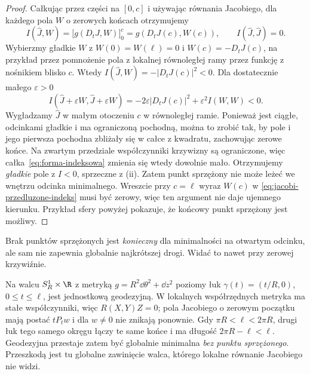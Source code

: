 \begin{proof}
Całkując przez części na $[0,c]$ i używając
równania Jacobiego, dla każdego pola $W$
o zerowych końcach otrzymujemy
\begin{equation}\label{eq:jacobi-przedluzone-indeks}
 I(\widehat J,W)
 =\bigl[g(D_tJ,W)\bigr]_0^c
 =g(D_tJ(c),W(c)),
 \qquad I(\widehat J,\widehat J)=0.
\end{equation}
Wybierzmy gładkie $W$ z $W(0)=W(\ell)=0$
i $W(c)=-D_tJ(c)$, na przykład przez
pomnożenie pola z lokalnej równoległej ramy
przez funkcję z nośnikiem blisko $c$.
Wtedy $I(\widehat J,W)=-|D_tJ(c)|^2<0$.
Dla dostatecznie małego $\varepsilon>0$
\[
 I(\widehat J+\varepsilon W,
   \widehat J+\varepsilon W)
 =-2\varepsilon|D_tJ(c)|^2
       +\varepsilon^2 I(W,W)<0.
\]
Wygładzamy $\widehat J$ w małym otoczeniu $c$
w równoległej ramie. Ponieważ jest ciągłe,
odcinkami gładkie i ma ograniczoną pochodną,
można to zrobić tak, by pole i jego pierwsza
pochodna zbliżały się w całce z kwadratu,
zachowując zerowe końce. Na zwartym przedziale
współczynniki krzywizny są ograniczone,
więc całka~\eqref{eq:forma-indeksowa}
zmienia się wtedy dowolnie mało. Otrzymujemy
\emph{gładkie} pole z $I<0$, sprzeczne z (ii).
Zatem punkt sprzężony nie może leżeć
we wnętrzu odcinka minimalnego.
Wreszcie przy $c=\ell$ wyraz $W(c)$ w
\eqref{eq:jacobi-przedluzone-indeks} musi
być zerowy, więc ten argument nie daje
ujemnego kierunku. Przykład sfery powyżej
pokazuje, że końcowy punkt sprzężony jest
możliwy.
\end{proof}

Brak punktów sprzężonych jest \emph{konieczny}
dla minimalności na otwartym odcinku,
ale sam nie zapewnia globalnie najkrótszej drogi.
Widać to nawet przy zerowej krzywiźnie.

\begin{przyklad}
\label{prz:jacobi-plaski-walec}
Na walcu $S_R^1\times\R$ z metryką
$g=R^2\dd\theta^2+\dd z^2$ poziomy łuk
$\gamma(t)=(t/R,0)$, $0\leq t\leq\ell$,
jest jednostkową geodezyjną. W lokalnych
współrzędnych metryka ma stałe współczynniki,
więc $R(X,Y)Z=0$; pola Jacobiego o zerowym
początku mają postać $tP_tw$ i dla $w\ne0$ nie znikają
ponownie. Gdy $\pi R<\ell<2\pi R$, drugi
łuk tego samego okręgu łączy te same końce
i ma długość $2\pi R-\ell<\ell$.
Geodezyjna przestaje zatem być globalnie
minimalna \emph{bez punktu sprzężonego}.
Przeszkodą jest tu globalne zawinięcie walca,
którego lokalne równanie Jacobiego nie widzi.
\end{przyklad}

